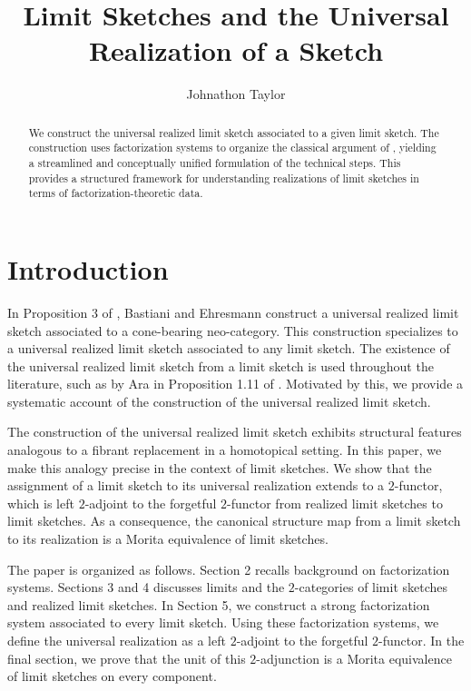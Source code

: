\documentclass{tac}
\title{Limit Sketches and the Universal Realization of a
Sketch}
\author{Johnathon Taylor}
\begin{document}
\maketitle

\begin{abstract}
We construct the universal realized limit sketch associated to a given limit sketch. The construction uses factorization systems to organize the classical argument of \cite{BastChar}, yielding a streamlined and conceptually unified formulation of the technical steps. This provides a structured framework for understanding realizations of limit sketches in terms of factorization-theoretic data.
\end{abstract}




\section{Introduction}

In Proposition 3 of \cite{BastChar}, Bastiani and Ehresmann construct a universal realized limit sketch associated to a cone-bearing neo-category. This construction specializes to a universal realized limit sketch associated to any limit sketch. The existence of the universal realized limit sketch from a limit sketch is used throughout the literature, such as by Ara in Proposition 1.11 of \cite{Dim1}. Motivated by this, we provide a systematic account of the construction of the universal realized limit sketch.

The construction of the universal realized limit sketch exhibits structural features analogous to a fibrant replacement in a homotopical setting. In this paper, we make this analogy precise in the context of limit sketches. We show that the assignment of a limit sketch to its universal realization extends to a $2$-functor, which is left $2$-adjoint to the forgetful $2$-functor from realized limit sketches to limit sketches. As a consequence, the canonical structure map from a limit sketch to its realization is a Morita equivalence of limit sketches.

The paper is organized as follows. Section 2 recalls background on factorization systems. Sections 3 and 4 discusses limits and the $2$-categories of limit sketches and realized limit sketches. In Section 5, we construct a strong factorization system associated to every limit sketch. Using these factorization systems, we define the universal realization as a left $2$-adjoint to the forgetful $2$-functor. In the final section, we prove that the unit of this $2$-adjunction is a Morita equivalence of limit sketches on every component.
\end{document}
